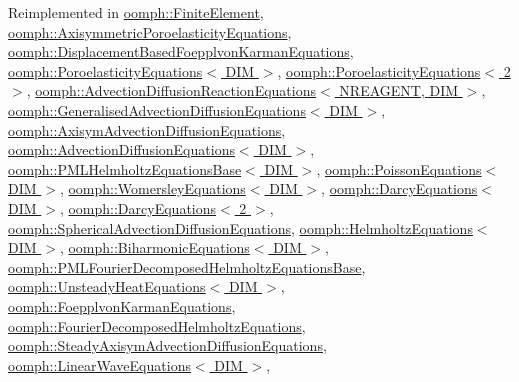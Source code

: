 Reimplemented in \hyperlink{classoomph_1_1FiniteElement_af94c5a5e22175d5420b33b3b79e46ed3}{oomph\+::\+Finite\+Element}, \hyperlink{classoomph_1_1AxisymmetricPoroelasticityEquations_a29c6268b887580ed0fbb65900467869b}{oomph\+::\+Axisymmetric\+Poroelasticity\+Equations}, \hyperlink{classoomph_1_1DisplacementBasedFoepplvonKarmanEquations_a3e1ad8befd0561258f86c8e97da30744}{oomph\+::\+Displacement\+Based\+Foepplvon\+Karman\+Equations}, \hyperlink{classoomph_1_1PoroelasticityEquations_ad655780a10fff85d3d0b87738decfb4d}{oomph\+::\+Poroelasticity\+Equations$<$ D\+I\+M $>$}, \hyperlink{classoomph_1_1PoroelasticityEquations_ad655780a10fff85d3d0b87738decfb4d}{oomph\+::\+Poroelasticity\+Equations$<$ 2 $>$}, \hyperlink{classoomph_1_1AdvectionDiffusionReactionEquations_a30b954f7ec758cf93a4b477a8652c9e2}{oomph\+::\+Advection\+Diffusion\+Reaction\+Equations$<$ N\+R\+E\+A\+G\+E\+N\+T, D\+I\+M $>$}, \hyperlink{classoomph_1_1GeneralisedAdvectionDiffusionEquations_a77d006ee2f3f4097ad74b180366ddc77}{oomph\+::\+Generalised\+Advection\+Diffusion\+Equations$<$ D\+I\+M $>$}, \hyperlink{classoomph_1_1AxisymAdvectionDiffusionEquations_a43146d9ddd728dd85340629acb726183}{oomph\+::\+Axisym\+Advection\+Diffusion\+Equations}, \hyperlink{classoomph_1_1AdvectionDiffusionEquations_ac9f27a62a29a9c3c850505f4cb9c00b7}{oomph\+::\+Advection\+Diffusion\+Equations$<$ D\+I\+M $>$}, \hyperlink{classoomph_1_1PMLHelmholtzEquationsBase_a92b8b911dde0f9ece84d1b06a7b93936}{oomph\+::\+P\+M\+L\+Helmholtz\+Equations\+Base$<$ D\+I\+M $>$}, \hyperlink{classoomph_1_1PoissonEquations_a04816974542e5764e1ec3f88d69b99ab}{oomph\+::\+Poisson\+Equations$<$ D\+I\+M $>$}, \hyperlink{classoomph_1_1WomersleyEquations_acdcc63b1f495caa704aec0c5c170b030}{oomph\+::\+Womersley\+Equations$<$ D\+I\+M $>$}, \hyperlink{classoomph_1_1DarcyEquations_adee6b430a8f62190a5cad003c195f52e}{oomph\+::\+Darcy\+Equations$<$ D\+I\+M $>$}, \hyperlink{classoomph_1_1DarcyEquations_adee6b430a8f62190a5cad003c195f52e}{oomph\+::\+Darcy\+Equations$<$ 2 $>$}, \hyperlink{classoomph_1_1SphericalAdvectionDiffusionEquations_a058fcdc912959c322e704d82d33cde6c}{oomph\+::\+Spherical\+Advection\+Diffusion\+Equations}, \hyperlink{classoomph_1_1HelmholtzEquations_a24ce807aa74efd08b3cde1fc74fbfc72}{oomph\+::\+Helmholtz\+Equations$<$ D\+I\+M $>$}, \hyperlink{classoomph_1_1BiharmonicEquations_a45c5d9248207cb2f3fa584e2b8137d82}{oomph\+::\+Biharmonic\+Equations$<$ D\+I\+M $>$}, \hyperlink{classoomph_1_1PMLFourierDecomposedHelmholtzEquationsBase_a9fd7dac4497a8c7fb47a02407dedf30f}{oomph\+::\+P\+M\+L\+Fourier\+Decomposed\+Helmholtz\+Equations\+Base}, \hyperlink{classoomph_1_1UnsteadyHeatEquations_a6f16f48984d7edf9e67818d9e4bbcf13}{oomph\+::\+Unsteady\+Heat\+Equations$<$ D\+I\+M $>$}, \hyperlink{classoomph_1_1FoepplvonKarmanEquations_a9aa68e9f999db1fe746f13a6b6a02b73}{oomph\+::\+Foepplvon\+Karman\+Equations}, \hyperlink{classoomph_1_1FourierDecomposedHelmholtzEquations_a5cf034d730e1f1f87be5400d20a57031}{oomph\+::\+Fourier\+Decomposed\+Helmholtz\+Equations}, \hyperlink{classoomph_1_1SteadyAxisymAdvectionDiffusionEquations_a2e50d7fafef6baa759e2807765ddc364}{oomph\+::\+Steady\+Axisym\+Advection\+Diffusion\+Equations}, \hyperlink{classoomph_1_1LinearWaveEquations_a2e4ced01331ace59c6d8fe95a756ca73}{oomph\+::\+Linear\+Wave\+Equations$<$ D\+I\+M $>$}, 
